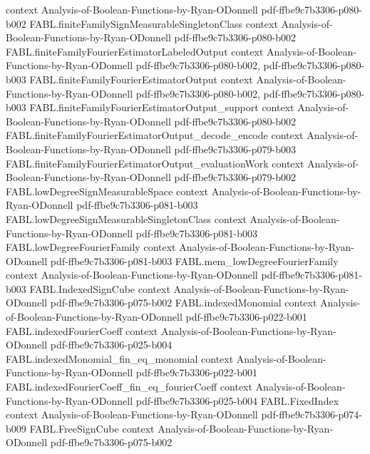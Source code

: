 \begin{theorem}
  {context}
  {Analysis-of-Boolean-Functions-by-Ryan-ODonnell}
  {pdf-ffbe9c7b3306-p080-b002}
\proofstep
  {FABL.finiteFamilySignMeasurableSingletonClass}
  {context}
  {Analysis-of-Boolean-Functions-by-Ryan-ODonnell}
  {pdf-ffbe9c7b3306-p080-b002}
\proofstep
  {FABL.finiteFamilyFourierEstimatorLabeledOutput}
  {context}
  {Analysis-of-Boolean-Functions-by-Ryan-ODonnell}
  {pdf-ffbe9c7b3306-p080-b002,
    pdf-ffbe9c7b3306-p080-b003}
\proofstep
  {FABL.finiteFamilyFourierEstimatorOutput}
  {context}
  {Analysis-of-Boolean-Functions-by-Ryan-ODonnell}
  {pdf-ffbe9c7b3306-p080-b002,
    pdf-ffbe9c7b3306-p080-b003}
\proofstep
  {FABL.finiteFamilyFourierEstimatorOutput_support}
  {context}
  {Analysis-of-Boolean-Functions-by-Ryan-ODonnell}
  {pdf-ffbe9c7b3306-p080-b002}
\proofstep
  {FABL.finiteFamilyFourierEstimatorOutput_decode_encode}
  {context}
  {Analysis-of-Boolean-Functions-by-Ryan-ODonnell}
  {pdf-ffbe9c7b3306-p079-b003}
\proofstep
  {FABL.finiteFamilyFourierEstimatorOutput_evaluationWork}
  {context}
  {Analysis-of-Boolean-Functions-by-Ryan-ODonnell}
  {pdf-ffbe9c7b3306-p079-b002}
\proofstep
  {FABL.lowDegreeSignMeasurableSpace}
  {context}
  {Analysis-of-Boolean-Functions-by-Ryan-ODonnell}
  {pdf-ffbe9c7b3306-p081-b003}
\proofstep
  {FABL.lowDegreeSignMeasurableSingletonClass}
  {context}
  {Analysis-of-Boolean-Functions-by-Ryan-ODonnell}
  {pdf-ffbe9c7b3306-p081-b003}
\proofstep
  {FABL.lowDegreeFourierFamily}
  {context}
  {Analysis-of-Boolean-Functions-by-Ryan-ODonnell}
  {pdf-ffbe9c7b3306-p081-b003}
\proofstep
  {FABL.mem_lowDegreeFourierFamily}
  {context}
  {Analysis-of-Boolean-Functions-by-Ryan-ODonnell}
  {pdf-ffbe9c7b3306-p081-b003}
\proofstep
  {FABL.IndexedSignCube}
  {context}
  {Analysis-of-Boolean-Functions-by-Ryan-ODonnell}
  {pdf-ffbe9c7b3306-p075-b002}
\proofstep
  {FABL.indexedMonomial}
  {context}
  {Analysis-of-Boolean-Functions-by-Ryan-ODonnell}
  {pdf-ffbe9c7b3306-p022-b001}
\proofstep
  {FABL.indexedFourierCoeff}
  {context}
  {Analysis-of-Boolean-Functions-by-Ryan-ODonnell}
  {pdf-ffbe9c7b3306-p025-b004}
\proofstep
  {FABL.indexedMonomial_fin_eq_monomial}
  {context}
  {Analysis-of-Boolean-Functions-by-Ryan-ODonnell}
  {pdf-ffbe9c7b3306-p022-b001}
\proofstep
  {FABL.indexedFourierCoeff_fin_eq_fourierCoeff}
  {context}
  {Analysis-of-Boolean-Functions-by-Ryan-ODonnell}
  {pdf-ffbe9c7b3306-p025-b004}
\proofstep
  {FABL.FixedIndex}
  {context}
  {Analysis-of-Boolean-Functions-by-Ryan-ODonnell}
  {pdf-ffbe9c7b3306-p074-b009}
\proofstep
  {FABL.FreeSignCube}
  {context}
  {Analysis-of-Boolean-Functions-by-Ryan-ODonnell}
  {pdf-ffbe9c7b3306-p075-b002}

\end{theorem}
